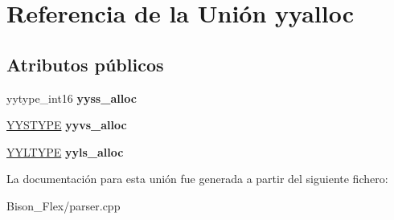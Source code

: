 \hypertarget{unionyyalloc}{\section{Referencia de la Unión yyalloc}
\label{unionyyalloc}
}
\subsection*{Atributos públicos}
\begin{DoxyCompactItemize}
\item 
\hypertarget{unionyyalloc_a4800e0520a89a4789afa7b5d82197e65}{yytype\-\_\-int16 {\bfseries yyss\-\_\-alloc}}\label{unionyyalloc_a4800e0520a89a4789afa7b5d82197e65}

\item 
\hypertarget{unionyyalloc_a9326f4fdc6f737a929444427836d8928}{\hyperlink{union_y_y_s_t_y_p_e}{Y\-Y\-S\-T\-Y\-P\-E} {\bfseries yyvs\-\_\-alloc}}\label{unionyyalloc_a9326f4fdc6f737a929444427836d8928}

\item 
\hypertarget{unionyyalloc_a542e43248e6afac9af342c2f4e3162fc}{\hyperlink{struct_y_y_l_t_y_p_e}{Y\-Y\-L\-T\-Y\-P\-E} {\bfseries yyls\-\_\-alloc}}\label{unionyyalloc_a542e43248e6afac9af342c2f4e3162fc}

\end{DoxyCompactItemize}


La documentación para esta unión fue generada a partir del siguiente fichero\-:\begin{DoxyCompactItemize}
\item 
Bison\-\_\-\-Flex/parser.\-cpp\end{DoxyCompactItemize}
